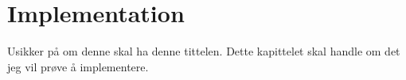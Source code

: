 \chapter{Implementation}

Usikker på om denne skal ha denne tittelen. Dette kapittelet skal handle om det jeg vil prøve å implementere. 